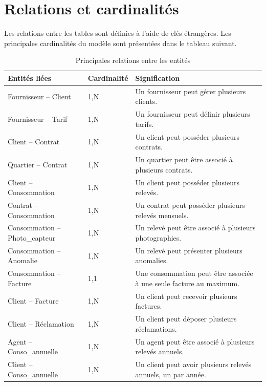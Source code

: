 \section{Relations et cardinalités}

Les relations entre les tables sont définies à l'aide de clés étrangères. Les principales cardinalités du modèle sont présentées dans le tableau suivant.

\begin{table}[H]
    \centering
    \caption{Principales relations entre les entités}
    \begin{tabularx}{\textwidth}{|l|l|X|}
        \hline
        \textbf{Entités liées} & \textbf{Cardinalité} & \textbf{Signification} \\
        \hline
        Fournisseur -- Client & 1,N & Un fournisseur peut gérer plusieurs clients. \\
        \hline
        Fournisseur -- Tarif & 1,N & Un fournisseur peut définir plusieurs tarifs. \\
        \hline
        Client -- Contrat & 1,N & Un client peut posséder plusieurs contrats. \\
        \hline
        Quartier -- Contrat & 1,N & Un quartier peut être associé à plusieurs contrats. \\
        \hline
        Client -- Consommation & 1,N & Un client peut posséder plusieurs relevés. \\
        \hline
        Contrat -- Consommation & 1,N & Un contrat peut posséder plusieurs relevés mensuels. \\
        \hline
        Consommation -- Photo\_capteur & 1,N & Un relevé peut être associé à plusieurs photographies. \\
        \hline
        Consommation -- Anomalie & 1,N & Un relevé peut présenter plusieurs anomalies. \\
        \hline
        Consommation -- Facture & 1,1 & Une consommation peut être associée à une seule facture au maximum. \\
        \hline
        Client -- Facture & 1,N & Un client peut recevoir plusieurs factures. \\
        \hline
        Client -- Réclamation & 1,N & Un client peut déposer plusieurs réclamations. \\
        \hline
        Agent -- Conso\_annuelle & 1,N & Un agent peut être associé à plusieurs relevés annuels. \\
        \hline
        Client -- Conso\_annuelle & 1,N & Un client peut avoir plusieurs relevés annuels, un par année. \\
        \hline
    \end{tabularx}
\end{table}

